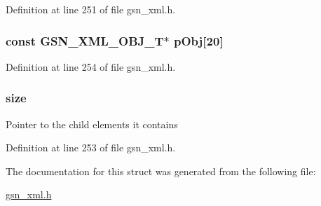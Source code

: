 Definition at line 251 of file gsn\_\-xml.h.

\hypertarget{a00429_a82d8a5e6155232806b66fedff1fb91fb}{
\subsubsection[{pObj}]{\setlength{\rightskip}{0pt plus 5cm}const {\bf GSN\_\-XML\_\-OBJ\_\-T}$\ast$ {\bf pObj}\mbox{[}20\mbox{]}}}
\label{a00429_a82d8a5e6155232806b66fedff1fb91fb}


Definition at line 254 of file gsn\_\-xml.h.

\hypertarget{a00429_a68890417cb73114517d0d8c594bd282e}{
\subsubsection[{size}]{ {\bf size}}}
\label{a00429_a68890417cb73114517d0d8c594bd282e}
Pointer to the child elements it contains 

Definition at line 253 of file gsn\_\-xml.h.



The documentation for this struct was generated from the following file:\begin{DoxyCompactItemize}
\item 
\hyperlink{a00616}{gsn\_\-xml.h}\end{DoxyCompactItemize}
